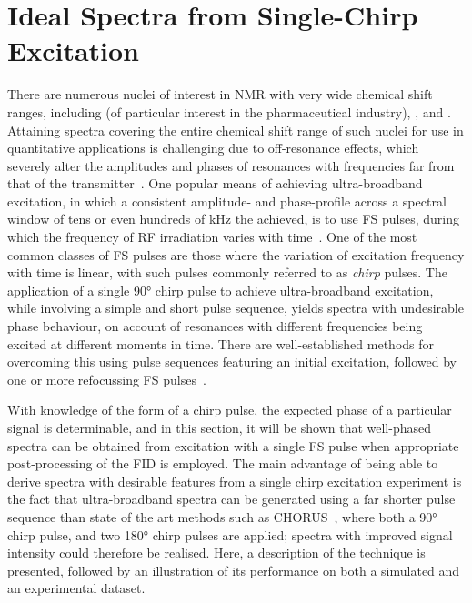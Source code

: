 \section{Ideal Spectra from Single-Chirp Excitation}
\label{sec:bbqchili}
There are numerous nuclei of interest in \ac{NMR} with very wide chemical shift
ranges, including  (of particular interest in the pharmaceutical
industry), , and .
Attaining spectra covering the entire chemical shift range of such nuclei for
use in quantitative applications is challenging due to off-resonance effects,
which severely alter the amplitudes and phases of resonances with frequencies
far from that of the transmitter~\cite[Section 3.4.1]{Cavanagh2007}. One
popular means of achieving ultra-broadband excitation, in which a consistent
amplitude- and phase-profile across a spectral window of tens or even hundreds
of \unit{\kilo\hertz} the achieved, is to use \ac{FS} pulses, during
which the frequency of \ac{RF} irradiation varies with
time~\cite{Foroozandeh2020}. One of the most common classes of \ac{FS} pulses
are those where the variation of excitation frequency with time is linear, with
such pulses commonly referred to as \emph{chirp} pulses. The application of a
single \ang{90} chirp pulse to achieve ultra-broadband excitation, while
involving a simple and short pulse sequence, yields
spectra with undesirable phase behaviour, on account of resonances with
different frequencies being excited at different moments in time.
There are well-established methods for overcoming this using
pulse sequences featuring an initial excitation, followed by one or more
refocussing \ac{FS}
pulses~\cite{Bohlen1989,Bohlen1993,Cano2002,Power2016,Foroozandeh2019}.
\label{corr:opt-con-pulses}

With knowledge of the form of a chirp pulse, the expected phase of a
particular signal is determinable, and in this section, it will be shown
that well-phased spectra can be obtained from excitation with a single \ac{FS}
pulse when appropriate post-processing of the \ac{FID} is employed.
The main advantage of being able to derive spectra with desirable features from
a single chirp excitation experiment is the fact that ultra-broadband spectra
can be generated using a far shorter pulse sequence than state of the art
methods such as \ac{CHORUS}~\cite{Power2016,Foroozandeh2019}, where both a
\ang{90} chirp pulse, and two \ang{180} chirp pulses are applied; spectra with
improved signal intensity could therefore be realised. Here, a description of the
technique is presented, followed by an illustration of its performance on both a
simulated and an experimental dataset.

